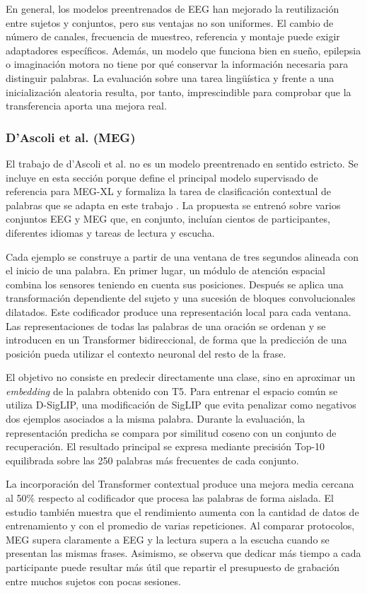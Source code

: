 En general, los modelos preentrenados de EEG han mejorado la reutilización entre sujetos y conjuntos, pero sus ventajas no son uniformes. El cambio de número de canales, frecuencia de muestreo, referencia y montaje puede exigir adaptadores específicos. Además, un modelo que funciona bien en sueño, epilepsia o imaginación motora no tiene por qué conservar la información necesaria para distinguir palabras. La evaluación sobre una tarea lingüística y frente a una inicialización aleatoria resulta, por tanto, imprescindible para comprobar que la transferencia aporta una mejora real.

\subsubsection{D'Ascoli et al. (MEG)}

El trabajo de d'Ascoli et al. no es un modelo preentrenado en sentido estricto. Se incluye en esta sección porque define el principal modelo supervisado de referencia para MEG-XL y formaliza la tarea de clasificación contextual de palabras que se adapta en este trabajo \cite{dascoli2024words}. La propuesta se entrenó sobre varios conjuntos EEG y MEG que, en conjunto, incluían cientos de participantes, diferentes idiomas y tareas de lectura y escucha.

Cada ejemplo se construye a partir de una ventana de tres segundos alineada con el inicio de una palabra. En primer lugar, un módulo de atención espacial combina los sensores teniendo en cuenta sus posiciones. Después se aplica una transformación dependiente del sujeto y una sucesión de bloques convolucionales dilatados. Este codificador produce una representación local para cada ventana. Las representaciones de todas las palabras de una oración se ordenan y se introducen en un Transformer bidireccional, de forma que la predicción de una posición pueda utilizar el contexto neuronal del resto de la frase.

El objetivo no consiste en predecir directamente una clase, sino en aproximar un \textit{embedding} de la palabra obtenido con T5. Para entrenar el espacio común se utiliza D-SigLIP, una modificación de SigLIP que evita penalizar como negativos dos ejemplos asociados a la misma palabra. Durante la evaluación, la representación predicha se compara por similitud coseno con un conjunto de recuperación. El resultado principal se expresa mediante precisión Top-10 equilibrada sobre las 250 palabras más frecuentes de cada conjunto.

La incorporación del Transformer contextual produce una mejora media cercana al 50\% respecto al codificador que procesa las palabras de forma aislada. El estudio también muestra que el rendimiento aumenta con la cantidad de datos de entrenamiento y con el promedio de varias repeticiones. Al comparar protocolos, MEG supera claramente a EEG y la lectura supera a la escucha cuando se presentan las mismas frases. Asimismo, se observa que dedicar más tiempo a cada participante puede resultar más útil que repartir el presupuesto de grabación entre muchos sujetos con pocas sesiones.

